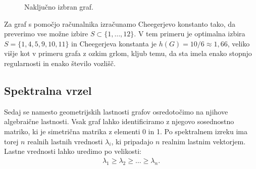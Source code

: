 \begin{primer}
\begin{figure}[t]
        \caption{Naključno izbran graf.}
        \label{fig:nakljucnograf}
    \end{figure}
    Za graf s pomočjo računalnika izračunamo Cheegerjevo konstanto tako, da preverimo vse možne izbire \(S \subset \{1, \ldots, 12\}\). V tem primeru je optimalna izbira \(S = \{1, 4, 5, 9, 10, 11\}\) in Cheegerjeva konstanta je \(h(G) = 10/6 \approx 1{,}66\), veliko višje kot v primeru grafa z ozkim grlom, kljub temu, da sta imela enako stopnjo regularnosti in enako število vozlišč.
\end{primer}
\subsection{Spektralna vrzel}
Sedaj se namesto geometrijskih lastnosti grafov osredotočimo na njihove algebraične lastnosti. Vsak graf lahko identificiramo z njegovo sosednostno matriko, ki je simetrična matrika z elementi 0 in 1. Po spektralnem izreku ima torej \(n\) realnih lastnih vrednosti \(\lambda_i\), ki pripadajo \(n\) realnim lastnim vektorjem. Lastne vrednosti lahko uredimo po velikosti:
\begin{align*}
    \lambda_1 \geq \lambda_2 \geq \ldots \geq \lambda_n.
\end{align*}

